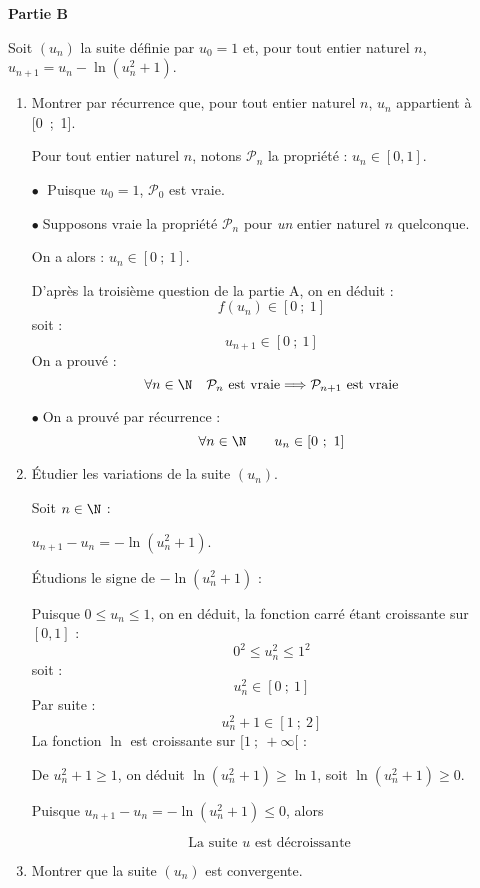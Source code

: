 \documentclass[12pt]{cornouaille}
\begin{document}
\begin{exercice}
\textbf{Partie B}

\medskip

Soit $\left(u_n\right)$ la suite définie par $u_0 = 1$ et, pour tout entier naturel $n$, $u_{n+1} = u_n -\ln \left(u_n^2 + 1\right)$.

\medskip

\begin{enumerate}
\item Montrer par récurrence que, pour tout entier naturel $n$, $u_n$ appartient à [0~;~1].

\begin{solution}
Pour tout entier naturel $n$, notons $\mathcal{P}_n$ la propriété : $u_n\in[0,1]$.

$\bullet\;$ Puisque $u_0=1$, $\mathcal{P}_0$ est vraie.
\par\medskip
$\bullet\;$Supposons vraie la propriété $\mathcal{P}_n$ pour \emph{un} entier naturel $n$ quelconque. 

On a alors : $u_n \in [0~;~1]$.

D'après la troisième question de la partie A, on en déduit : 
\[f(u_n)\in[0~;~1]\]
soit :
\[u_{n+1}\in[0~;~1]\]	
On a prouvé :
\[\forall n\in\N\quad \mathcal{P}_n\text{ est vraie}\Longrightarrow\mathcal{P}_{n+1}\text{ est vraie}\]
\par\medskip
$\bullet\;$On a prouvé par récurrence :
\[ \forall n\in\N\qquad u_n\in[0~;~1]\]
\end{solution}
\item Étudier les variations de la suite $\left(u_n\right)$.

\begin{solution}
Soit $n\in\N$ :

$u_{n+1}-u_n=-\ln(u_n^2+1)$. 

Étudions le signe de $-\ln(u_n^2+1)$ :

Puisque $0\leqslant u_n\leqslant 1$, on en déduit, la fonction carré étant croissante sur $[0,1]$ : 
\[0^2\leqslant u_n ^2\leqslant 1^2\]
soit :
\[u_n^2\in[0~;~1]\]
Par suite :
\[u_n^2+1\in[1~;~2]\]
La fonction $\ln$ est croissante sur $[1~;~+\infty[$ : 

De $u_n^2+1\geqslant 1$, on déduit $\ln \left(u_n^2+1\right)\geqslant \ln 1$, soit $\ln \left(u_n^2+1\right)\geqslant 0$.

Puisque $u_{n+1} -  u_n = -\ln(u_n^2+1)\leqslant 0$, alors

\[\text{La suite $u$ est décroissante }\]
\end{solution}
\item Montrer que la suite $\left(u_n\right)$ est convergente.


\end{enumerate}
\end{exercice}
\end{document}
